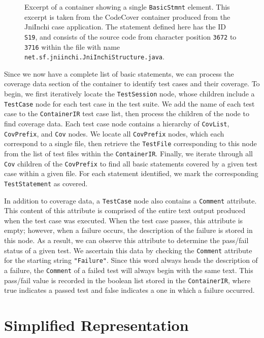 \begin{figure}[tb]
\centering

\caption{Excerpt of a container showing a single \texttt{BasicStmnt} element.  This excerpt is taken
from the CodeCover container produced from the JniInchi case application.  The statement defined here
has the ID \texttt{S19}, and consists of the source code from character position \texttt{3672} to 
\texttt{3716} within the file with name \texttt{net.sf.jniinchi.JniInchiStructure.java}.}
\label{fig:xml-basic}
\end{figure}

Since we now have a complete list of basic statements, we can process the coverage data section
of the container to identify test cases and their coverage.  To begin, we first iteratively 
locate the \texttt{TestSession} node, whose children include a \texttt{TestCase} node for
each test case in the test suite.  We add the name of each test case to the \texttt{ContainerIR}
test case list, then process the children of the node to find coverage data.  Each test case
node contains a hierarchy of \texttt{CovList}, \texttt{CovPrefix}, and \texttt{Cov} nodes.  We 
locate all \texttt{CovPrefix} nodes, which each correspond to a single file, then retrieve the
\texttt{TestFile} corresponding to this node from the list of test files within the \texttt{ContainerIR}.
Finally, we iterate through all \texttt{Cov} children of the \texttt{CovPrefix} to find all 
basic statements covered by a given test case within a given file.  For each statement identified,
we mark the corresponding \texttt{TestStatement} as covered.

In addition to coverage data, a \texttt{TestCase} node also contains a \texttt{Comment} attribute.
This content of this attribute is comprised of the entire text output produced when the test case
was executed.  When the test case passes, this attribute is empty; however, when a failure occurs,
the description of the failure is stored in this node.  As a result, we can observe this attribute
to determine the pass/fail status of a given test.  We ascertain this data by checking the
\texttt{Comment} attribute for the starting string \texttt{"Failure"}.  Since this word always
heads the description of a failure, the \texttt{Comment} of a failed test will always begin with
the same text.  This pass/fail value is recorded in the boolean list stored in the 
\texttt{ContainerIR}, where true indicates a passed test and false indicates a one in which a failure
occurred.

\section{Simplified Representation} \label{sec:sir}

